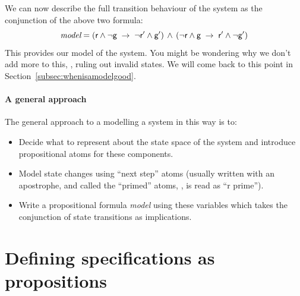 We can now describe the full transition behaviour of the system as
the conjunction of the above two formula:
%
\begin{equation*}
\textit{model} =
(\textsf{r}{} \wedge \neg\textsf{g}{} \; \rightarrow \; \neg\textsf{r}{}' \wedge
\textsf{g}{}')
\, \wedge \,
(\neg\textsf{r}{} \wedge \textsf{g}{} \; \rightarrow \; \textsf{r}{}' \wedge \neg\textsf{g}{}')
\end{equation*}
%
This provides our model of the system. You might be wondering why we
don't add more to this, \eg{}, ruling out invalid states. We will come
back to this point in Section~\ref{subsec:whenisamodelgood}.


\paragraph{A general approach}

The general approach to a modelling a system in this way is to:
%
\begin{itemize}
  \item Decide what to represent about the state space of the system
  and introduce propositional atoms for these components.
  \item Model state changes using ``next step'' atoms (usually written with
  an apostrophe, and called the ``primed'' atoms, \eg{}, \atomrp{} is
  read as ``r prime'').
 \item Write a propositional formula \emph{model} using these
  variables which takes the conjunction of state transitions as implications.
\end{itemize}

\section{Defining specifications as propositions}
\label{sec:spec}

